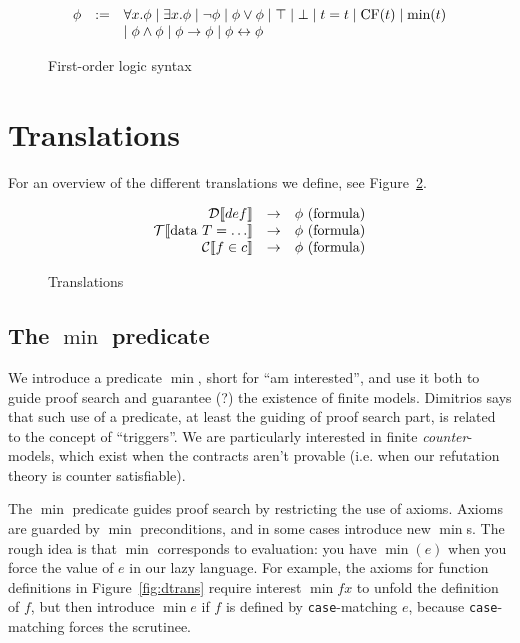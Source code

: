 \documentclass[preprint]{sigplanconf}
\begin{document}
\begin{figure}
 \centering
  \[  \begin{array}{rcl}
    \phi &:=& \forall x.\phi \mid \exists x.\phi \mid \lnot \phi \mid \phi \lor \phi \mid \top \mid \bot \mid t=t \mid \mbox{CF}(t) \mid \mbox{min}(t) \\
    && \mid \phi \land \phi \mid \phi \to \phi \mid \phi \leftrightarrow \phi
  \end{array} \]
  \caption{First-order logic syntax}
  \label{fol-stx}
\end{figure}


\section{Translations}
For an overview of the different translations we define, see
Figure~\ref{fig:all-trans}.

\begin{figure}
 \begin{center}
  \[  \begin{array}{rcl}
    \mathcal{D} \llbracket def \rrbracket &\to& \phi~(\mbox{formula}) \\
    \mathcal{T} \llbracket \mbox{data } T = \dots \rrbracket &\to& \phi~(\mbox{formula}) \\
    \mathcal{C} \llbracket f \in c \rrbracket &\to& \phi~(\mbox{formula}) \\
  \end{array} \]
  \end{center}
  \caption{Translations}
  \label{fig:all-trans}
\end{figure}

\subsection{The $\min$ predicate}

We introduce a predicate $\min$, short for ``am interested'', and use
it both to guide proof search and guarantee (?) the existence of
finite models.  Dimitrios says that such use of a predicate, at least
the guiding of proof search part, is related to the concept of
``triggers''.  We are particularly interested in finite
\emph{counter}-models, which exist when the contracts aren't provable
(i.e. when our refutation theory is counter satisfiable).

The $\min$ predicate guides proof search by restricting the use of
axioms. Axioms are guarded by $\min$ preconditions, and in some cases
introduce new $\min$s.  The rough idea is that $\min$ corresponds to
evaluation: you have $\min(e)$ when you force the value of $e$ in our
lazy language.  For example, the axioms for function definitions in
Figure~\ref{fig:dtrans} require interest $\min{f x}$ to unfold the
definition of $f$, but then introduce $\min{e}$ if $f$ is defined by
\texttt{case}-matching $e$, because \texttt{case}-matching forces the
scrutinee.
\end{document}
